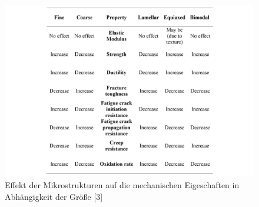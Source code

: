\begin{figure}[h]
	\centering
	\includegraphics[width=0.9\linewidth]{"Bilder/Tabelle 3"}
	\caption[Tabelle]{Effekt der Mikrostrukturen auf die mechanischen Eigeschaften in Abhängigkeit der Größe [3]}
	\label{fig:tabelle-3}
\end{figure}

\pagebreak

